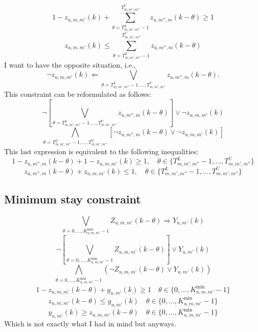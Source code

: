 \documentclass{tufte-handout}
\begin{document}
\[
    1 - z_{u, m, m'}\left(k\right) + \sum_{\theta = T^{L}_{m, m', m''}-1}^{T^{U}_{m, m', m''}} z_{u, m'', m}\left(k - \theta\right) \geq 1
\]
\[
    z_{u, m, m'}\left(k\right) \leq \sum_{\theta = T^{L}_{m, m', m''}-1}^{T^{U}_{m, m', m''}} z_{u, m'', m}\left(k - \theta\right)
\]
I want to have the opposite situation, i.e., 
\begin{equation}
    \neg z_{u,m,m'} \left(k\right) \Leftarrow \bigvee_{\theta = T^{L}_{m, m', m''}-1, \dots, T^{U}_{m, m', m''}} z_{u, m'', m}\left(k-\theta \right).
\end{equation}
This constraint can be reformulated as follows:
\[
    \neg \left[\bigvee_{\theta = T^{L}_{m, m', m''}-1, \dots, T^{U}_{m, m', m''}} z_{u, m'', m}\left(k-\theta\right) \right] \vee \neg z_{u, m, m'}\left(k\right)
\]
\[
    \bigwedge_{\theta = T^{L}_{m, m', m''}-1, \dots, T^{U}_{m, m', m''}} \left[ \neg z_{u, m'', m}\left(k- \theta \right) \vee \neg z_{u, m, m'}\left(k\right)\right]
\]
This last expression is equivalent to the following inequalities:
\[
    1-z_{u, m'', m} \left( k - \theta \right) + 1-z_{u, m, m'} \left( k \right) \geq 1, \quad \theta \in \{ T^{L}_{m, m', m''}-1, \dots, T^{U}_{m, m', m''} \}
\]    
\[
    z_{u, m'', m} \left( k - \theta \right) + z_{u, m, m'} \left( k \right)  \leq 1, \quad \theta \in \{ T^{L}_{m, m', m''}-1, \dots, T^{U}_{m, m', m''} \}
\]    
\subsection{Minimum stay constraint}
\begin{equation}
    \bigvee_{\theta = 0, \dots, K_{u,m,m'}^{\text{min}} -1} Z_{u, m, m'}\left(k-\theta \right) \Rightarrow Y_{u, m'} \left( k \right)
\end{equation}
\[
    \neg \left[\bigvee_{\theta = 0, \dots, K_{u,m,m'}^{\text{min}} -1} Z_{u, m, m'}\left(k-\theta \right) \right] \vee Y_{u, m'} \left(k \right)
\]
\[
    \bigwedge_{\theta = 0, \dots, K_{u,m,m'}^{\text{min}} -1} \left( \neg Z_{u, m, m'}\left(k-\theta \right) \vee Y_{u, m'} \left(k \right)
\right)
\]
\[
    1 - z_{u, m, m'}\left(k-\theta \right) + y_{u, m'} \left(k \right)\geq 1 \quad \theta \in \{ 0, \dots, K_{u,m,m'}^{\text{min}} -1\}  
\]
\[
    z_{u, m, m'}\left(k-\theta \right) \leq  y_{u, m'} \left(k \right) \quad \theta \in \{ 0, \dots, K_{u,m,m'}^{\text{min}} -1\}  
\]
\[
    y_{u, m'} \left(k \right) \geq z_{u, m, m'}\left(k-\theta \right) 
    \quad \theta \in \{ 0, \dots, K_{u,m,m'}^{\text{min}} -1\}  
\]
Which is not exactly what I had in mind but anyways. 
\end{document}
